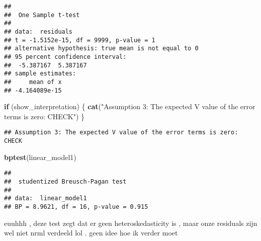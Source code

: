 \documentclass[
]{article}
\newenvironment{Shaded}{\begin{snugshade}}{\end{snugshade}}
\newcommand{\ControlFlowTok}[1]{\textcolor[rgb]{0.13,0.29,0.53}{\textbf{#1}}}
\newcommand{\FunctionTok}[1]{\textcolor[rgb]{0.13,0.29,0.53}{\textbf{#1}}}
\newcommand{\NormalTok}[1]{#1}
\newcommand{\StringTok}[1]{\textcolor[rgb]{0.31,0.60,0.02}{#1}}
\begin{document}
\begin{verbatim}
## 
##  One Sample t-test
## 
## data:  residuals
## t = -1.5152e-15, df = 9999, p-value = 1
## alternative hypothesis: true mean is not equal to 0
## 95 percent confidence interval:
##  -5.387167  5.387167
## sample estimates:
##     mean of x 
## -4.164089e-15
\end{verbatim}

\begin{Shaded}
\begin{Highlighting}[]
\ControlFlowTok{if}\NormalTok{ (show\_interpretation) \{}
  \FunctionTok{cat}\NormalTok{(}\StringTok{"Assumption 3: The expected V value of the error terms is zero: CHECK"}\NormalTok{)}
\NormalTok{\}}
\end{Highlighting}
\end{Shaded}

\begin{verbatim}
## Assumption 3: The expected V value of the error terms is zero: CHECK
\end{verbatim}

\begin{Shaded}
\begin{Highlighting}[]
\FunctionTok{bptest}\NormalTok{(linear\_model1)}
\end{Highlighting}
\end{Shaded}

\begin{verbatim}
## 
##  studentized Breusch-Pagan test
## 
## data:  linear_model1
## BP = 8.9621, df = 16, p-value = 0.915
\end{verbatim}

euuhhh , deze test zegt dat er geen heteroskedasticity is , maar onze
residuals zijn wel niet nrml verdeeld lol . geen idee hoe ik verder moet
\end{document}
